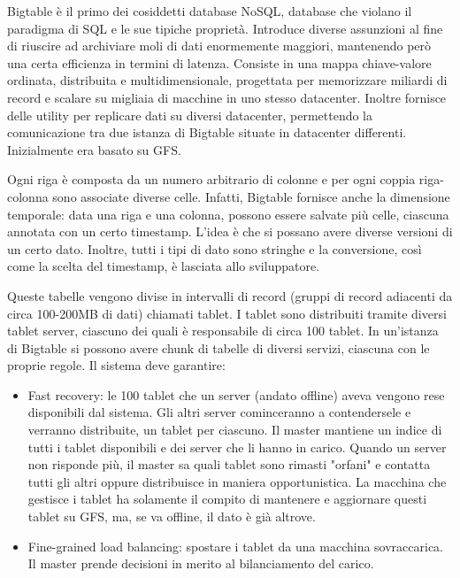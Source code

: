 Bigtable è il primo dei cosiddetti database NoSQL, database che violano il paradigma di SQL e le sue tipiche proprietà. Introduce diverse assunzioni al fine di riuscire ad archiviare moli di dati enormemente maggiori, mantenendo però una certa efficienza in termini di latenza. Consiste in una mappa chiave-valore ordinata, distribuita e multidimensionale, progettata per memorizzare miliardi di record e scalare su migliaia di macchine in uno stesso datacenter. Inoltre fornisce delle utility per replicare dati su diversi datacenter, permettendo la comunicazione tra due istanza di Bigtable situate in datacenter differenti. Inizialmente era basato su GFS.

Ogni riga è composta da un numero arbitrario di colonne e per ogni coppia riga-colonna sono associate diverse celle. Infatti, Bigtable fornisce anche la dimensione temporale: data una riga e una colonna, possono essere salvate più celle, ciascuna annotata con un certo timestamp. L'idea è che si possano avere diverse versioni di un certo dato. Inoltre, tutti i tipi di dato sono stringhe e la conversione, così come la scelta del timestamp, è lasciata allo sviluppatore.

Queste tabelle vengono divise in intervalli di record (gruppi di record adiacenti da circa 100-200MB di dati) chiamati tablet. I tablet sono distribuiti tramite diversi tablet server, ciascuno dei quali è responsabile di circa 100 tablet. In un'istanza di Bigtable si possono avere chunk di tabelle di diversi servizi, ciascuna con le proprie regole. Il sistema deve garantire:

\begin{itemize}
    \item Fast recovery: le 100 tablet che un server (andato offline) aveva vengono rese disponibili dal sistema. Gli altri server cominceranno a contendersele e verranno distribuite, un tablet per ciascuno. Il master mantiene un indice di tutti i tablet disponibili e dei server che li hanno in carico. Quando un server non risponde più, il master sa quali tablet sono rimasti "orfani" e contatta tutti gli altri oppure distribuisce in maniera opportunistica. La macchina che gestisce i tablet ha solamente il compito di mantenere e aggiornare questi tablet su GFS, ma, se va offline, il dato è già altrove.
    \item Fine-grained load balancing: spostare i tablet da una macchina sovraccarica. Il master prende decisioni in merito al bilanciamento del carico.
\end{itemize}

